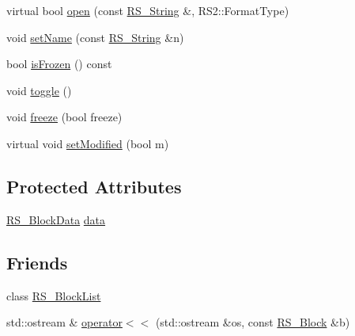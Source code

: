 \begin{DoxyCompactItemize}
\item 
virtual bool \hyperlink{class_r_s___block_a04ffb140e3d5c4a943c9de44575c36ba}{open} (const \hyperlink{rs__string_8h_a5adec11f318c2ae2ecdc6fe2b03be9fa}{R\-S\-\_\-\-String} \&, R\-S2\-::\-Format\-Type)
\item 
void \hyperlink{class_r_s___block_a048d319f67a2407fff1a68ce1bfd627d}{set\-Name} (const \hyperlink{rs__string_8h_a5adec11f318c2ae2ecdc6fe2b03be9fa}{R\-S\-\_\-\-String} \&n)
\item 
bool \hyperlink{class_r_s___block_ac43440d111abe6c1cc9ddae9b0f5727d}{is\-Frozen} () const 
\item 
void \hyperlink{class_r_s___block_ad79ccca26afa6e02dea92bcd165eb360}{toggle} ()
\item 
void \hyperlink{class_r_s___block_af5ef165dda427fe7b87aa4bb0e125bcf}{freeze} (bool freeze)
\item 
virtual void \hyperlink{class_r_s___block_a8eb16a6072c651f59caa7725ea6e2331}{set\-Modified} (bool m)
\end{DoxyCompactItemize}
\subsection*{Protected Attributes}
\begin{DoxyCompactItemize}
\item 
\hyperlink{class_r_s___block_data}{R\-S\-\_\-\-Block\-Data} \hyperlink{class_r_s___block_ae9303e76ea74cbf42f95ba9a1e476b1b}{data}
\end{DoxyCompactItemize}
\subsection*{Friends}
\begin{DoxyCompactItemize}
\item 
class \hyperlink{class_r_s___block_af76093eaee24d0094ffbb739efcff4e1}{R\-S\-\_\-\-Block\-List}
\item 
std\-::ostream \& \hyperlink{class_r_s___block_a929f76719c4bd8106f359c10c45fb9fe}{operator$<$$<$} (std\-::ostream \&os, const \hyperlink{class_r_s___block}{R\-S\-\_\-\-Block} \&b)
\end{DoxyCompactItemize}


